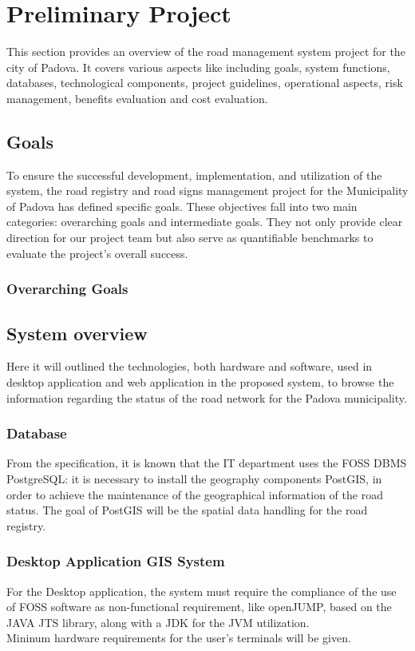 \section{Preliminary Project}
This section provides an overview of the road management system project for the city of Padova. It covers various aspects like including goals, system functions, databases, technological components, project guidelines, operational aspects, risk management, benefits evaluation and cost evaluation. 

\subsection{Goals}
To ensure the successful development, implementation, and utilization of the system, the road registry and road signs management project for the Municipality of Padova has defined specific goals. These objectives fall into two main categories: overarching goals and intermediate goals. They not only provide clear direction for our project team but also serve as quantifiable benchmarks to evaluate the project's overall success.

\subsubsection{Overarching Goals}

\subsection{System overview}
Here it will outlined the technologies, both hardware and software, used in desktop application and web application in the proposed system, to browse the information regarding the status of the road network for the Padova municipality.

\subsubsection{Database}
From the specification, it is known that the IT department uses the FOSS DBMS PostgreSQL: it is necessary to install the geography components PostGIS, in order to achieve the maintenance of the geographical information of the road status.
The goal of PostGIS will be the spatial data handling for the road registry.

\subsubsection{Desktop Application GIS System}
For the Desktop application, the system must require the compliance of the use of FOSS software as non-functional requirement, like openJUMP, based on the JAVA JTS library, along with a JDK for the JVM utilization. \\
Mininum hardware requirements for the user's terminals will be given.

